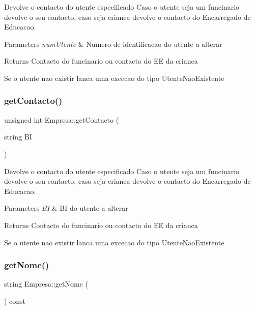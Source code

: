 Devolve o contacto do utente especificado Caso o utente seja um funcinario devolve o seu contacto, caso seja crianca devolve o contacto do Encarregado de Educacao. 


\begin{DoxyParams}{Parameters}
{\em num\+Utente} & Numero de identificacao do utente a alterar\\
\hline
\end{DoxyParams}
\begin{DoxyReturn}{Returns}
Contacto do funcinario ou contacto do EE da crianca
\end{DoxyReturn}
Se o utente nao existir lanca uma excecao do tipo Utente\+Nao\+Existente \mbox{\label{class_empresa_aef73b3ec5119615f092a71a149c7f9eb}} 
\subsubsection{\texorpdfstring{get\+Contacto()}{getContacto()}\hspace{0.1cm}{\footnotesize\ttfamily [2/2]}}
{\footnotesize\ttfamily unsigned int Empresa\+::get\+Contacto (\begin{DoxyParamCaption}\item[{string}]{BI }\end{DoxyParamCaption})}



Devolve o contacto do utente especificado Caso o utente seja um funcinario devolve o seu contacto, caso seja crianca devolve o contacto do Encarregado de Educacao. 


\begin{DoxyParams}{Parameters}
{\em BI} & BI do utente a alterar\\
\hline
\end{DoxyParams}
\begin{DoxyReturn}{Returns}
Contacto do funcinario ou contacto do EE da crianca
\end{DoxyReturn}
Se o utente nao existir lanca uma excecao do tipo Utente\+Nao\+Existente \mbox{\label{class_empresa_af18ca7018ca4771c59ee3b36bc6c213b}} 
\subsubsection{\texorpdfstring{get\+Nome()}{getNome()}}
{\footnotesize\ttfamily string Empresa\+::get\+Nome (\begin{DoxyParamCaption}{ }\end{DoxyParamCaption}) const\hspace{0.3cm}{\ttfamily [inline]}}



